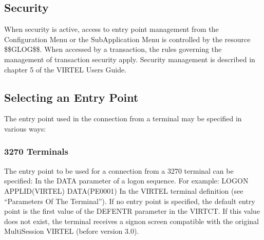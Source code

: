 \documentclass[letterpaper,10pt,english]{sphinxmanual}
\begin{document}
\ignorespaces 

\subsection{Security}
\label{\detokenize{connectivity_guide:index-104}}\label{\detokenize{connectivity_guide:id55}}
\sphinxAtStartPar
When security is active, access to entry point management from the Configuration Menu or the Sub\sphinxhyphen{}Application Menu is controlled by the resource \$\$GLOG\$\$. When accessed by a transaction, the rules governing the management of transaction security apply. Security management is described in chapter 5 of the VIRTEL Users Guide.

\ignorespaces 

\subsection{Selecting an Entry Point}
\label{\detokenize{connectivity_guide:selecting-an-entry-point}}\label{\detokenize{connectivity_guide:index-105}}
\sphinxAtStartPar
The entry point used in the connection from a terminal may be specified in various ways:


\subsubsection{3270 Terminals}
\label{\detokenize{connectivity_guide:id56}}
\sphinxAtStartPar
The entry point to be used for a connection from a 3270 terminal can be specified:
\sphinxhyphen{} In the DATA parameter of a logon sequence. For example: LOGON APPLID(VIRTEL) DATA(PE\sphinxhyphen{}0001)
\sphinxhyphen{} In the VIRTEL terminal definition (see “Parameters Of The Terminal”).
\sphinxhyphen{} If no entry point is specified, the default entry point is the first value of the DEFENTR parameter in the VIRTCT. If this value does not exist, the terminal receives a signon screen compatible with the original Multi\sphinxhyphen{}Session VIRTEL (before version 3.0).
\end{document}
